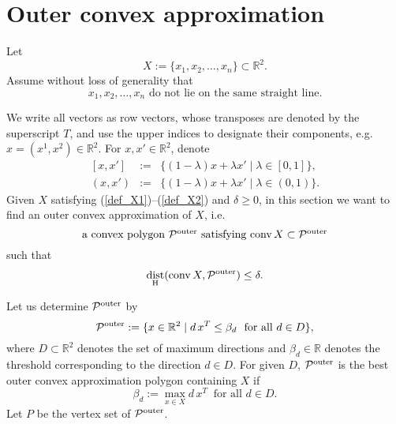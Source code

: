 \documentclass[12pt]{article}
\DeclareMathOperator{\conv}{conv}
\DeclareMathOperator{\dist}{dist}
\def\R{\mathbb{R}}
\begin{document}
\section{Outer convex approximation}\label{OuterConvexApproximation}
Let
\begin{equation}\label{def_X1}
X := \{x_1, x_2, \dots, x_n\} \subset \R^2.
\end{equation}
Assume without loss of generality that
\begin{equation}\label{def_X2}
\mbox{$x_1, x_2, \dots, x_n$ do not lie on the same straight line.}
\end{equation}

We write all vectors as row vectors, whose transposes are denoted by the superscript $T$, and use 
the upper indices to designate their components, e.g. $x = (x^1, x^2) \in \R^2$. For $x, x' \in \R^2$, denote 
\begin{equation*}
\begin{array}{lcl}
[x, x'] &:=& \{(1-\lambda) x + \lambda x' \mid \lambda\in [0, 1]\}, \\
(x, x') &:=& \{(1-\lambda) x + \lambda x' \mid \lambda\in (0, 1)\}.
\end{array}
\end{equation*}
Given $X$ satisfying (\ref{def_X1})--(\ref{def_X2}) and $\delta \geq 0$,
in this section we want to find an outer convex approximation of $X$, i.e.
\begin{equation}\label{def_calPouter-1}
\mbox{a convex polygon ${\cal P}^{\rm outer}$ satisfying $\conv X \subset {\cal P}^{\rm outer}$} 
\end{equation}
such that
\begin{equation}\label{def_calPouter-2}
\dist_{\rm H}(\conv X, {\cal P}^{\rm outer}) \leq \delta.
\end{equation}

Let us determine ${\cal P}^{\rm outer}$ by
\begin{equation}\label{def_calPouter0}
{\cal P}^{\rm outer} := \{x \in \R^2 \mid d\, x^T \leq \beta_d \ \mbox{ for all } d \in D\},
\end{equation}
where $D \subset \R^2$ denotes the set of maximum directions and $\beta_d \in \R$ denotes the threshold corresponding to the direction $d \in D$.
For given $D$, ${\cal P}^{\rm outer}$ is the best outer convex approximation polygon containing $X$ if
\begin{equation}\label{def_betad}
\beta_d := \max_{x \in X} d\, x^T \ \mbox{ for all } d \in D.
\end{equation}
Let $P$ be the vertex set of ${\cal P}^{\rm outer}$.
\end{document}
